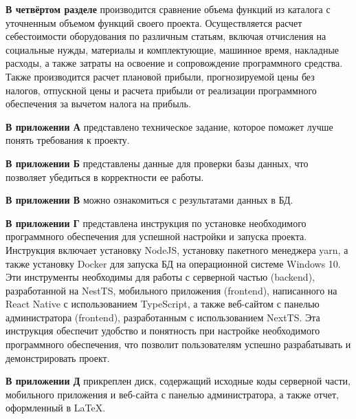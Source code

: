 \textbf{В четвёртом разделе}
производится сравнение объема функций из каталога с уточненным объемом функций своего проекта.
Осуществляется расчет себестоимости оборудования по различным статьям,
включая отчисления на социальные нужды, материалы и комплектующие,
машинное время, накладные расходы, а также затраты на освоение и сопровождение программного средства.
Также производится расчет плановой прибыли, прогнозируемой цены без налогов, отпускной цены и
расчета прибыли от реализации программного обеспечения за вычетом налога на прибыль.

\textbf{В приложении А}
представлено техническое задание, которое поможет лучше понять требования к проекту.

\textbf{В приложении Б}
представлены данные для проверки базы данных, что позволяет убедиться в корректности ее работы.

\textbf{В приложении В}
можно ознакомиться с результатами данных в БД.

\textbf{В приложении Г}
представлена инструкция по установке необходимого программного обеспечения для успешной настройки и запуска проекта.
Инструкция включает установку NodeJS, установку пакетного менеджера yarn,
а также установку Docker для запуска БД на операционной системе Windows 10.
Эти инструменты необходимы для работы с серверной частью (backend), разработанной на NestTS,
мобильного приложения (frontend), написанного на React Native с использованием TypeScript,
а также веб-сайтом с панелью администратора (frontend), разработанным с использованием NextTS.
Эта инструкция обеспечит удобство и понятность при настройке необходимого программного обеспечения,
что позволит пользователям успешно разрабатывать и демонстрировать проект.

\textbf{В приложении Д}
прикреплен диск, содержащий исходные коды серверной части,
мобильного приложения и веб-сайта с панелью администратора,
а также отчет, оформленный в LaTeX.


\newpage
